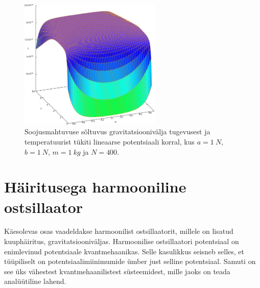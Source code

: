 \documentclass{trkut}%
\begin{document}
\begin{figure}[htb!]
    \includegraphics[width=0.6\textwidth]{maxima/m1a1b1T0_10S400.pdf}
    \caption{Soojusmahtuvuse sõltuvus gravitatsioonivälja tugevusest ja temperatuurist tükiti lineaarse potentsiaali korral, kus $a=\SI{1}{N}$, $b=\SI{1}{N}$, $m=\SI{1}{kg}$ ja $N=400$.}
    \label{joon4}
\end{figure}




%

\section{Häiritusega harmooniline ostsillaator}

Käesolevas osas vaadeldakse harmoonilist ostsillaatorit, millele on lisatud kuuphäiritus, gravitatsiooniväljas.
Harmoonilise ostsillaatori potentsiaal on enimlevinud potentsiaale kvantmehaanikas.
Selle kasulikkus seisneb selles, et tüüpiliselt on potentsiaalimiinimumide ümber just selline potentsiaal.
Samuti on see üks vähestest kvantmehaanilistest süsteemidest, mille jaoks on teada analüütiline lahend.
\end{document}
